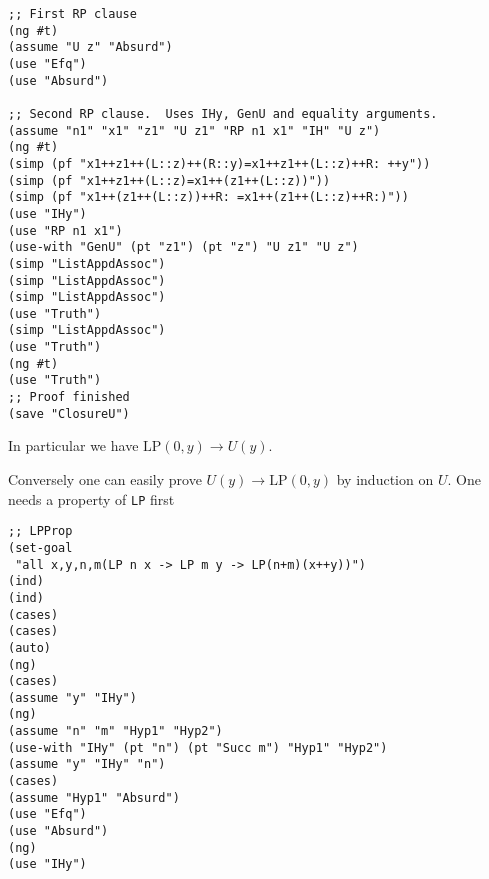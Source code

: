 \documentclass[12pt]{amsart}
\begin{document}
\begin{appendix}
\begin{verbatim}
;; First RP clause
(ng #t)
(assume "U z" "Absurd")
(use "Efq")
(use "Absurd")

;; Second RP clause.  Uses IHy, GenU and equality arguments.
(assume "n1" "x1" "z1" "U z1" "RP n1 x1" "IH" "U z")
(ng #t)
(simp (pf "x1++z1++(L::z)++(R::y)=x1++z1++(L::z)++R: ++y"))
(simp (pf "x1++z1++(L::z)=x1++(z1++(L::z))"))
(simp (pf "x1++(z1++(L::z))++R: =x1++(z1++(L::z)++R:)"))
(use "IHy")
(use "RP n1 x1")
(use-with "GenU" (pt "z1") (pt "z") "U z1" "U z")
(simp "ListAppdAssoc")
(simp "ListAppdAssoc")
(simp "ListAppdAssoc")
(use "Truth")
(simp "ListAppdAssoc")
(use "Truth")
(ng #t)
(use "Truth")
;; Proof finished
(save "ClosureU")
\end{verbatim}
In particular we have $\mathrm{LP}(0,y) \to U(y)$.

Conversely one can easily prove $U(y) \to \mathrm{LP}(0,y)$ by
induction on $U$.  One needs a property of \verb|LP| first
\begin{verbatim}
;; LPProp
(set-goal
 "all x,y,n,m(LP n x -> LP m y -> LP(n+m)(x++y))")
(ind)
(ind)
(cases)
(cases)
(auto)
(ng)
(cases)
(assume "y" "IHy")
(ng)
(assume "n" "m" "Hyp1" "Hyp2")
(use-with "IHy" (pt "n") (pt "Succ m") "Hyp1" "Hyp2")
(assume "y" "IHy" "n")
(cases)
(assume "Hyp1" "Absurd")
(use "Efq")
(use "Absurd")
(ng)
(use "IHy")


\end{verbatim}
\end{appendix}
\end{document}
